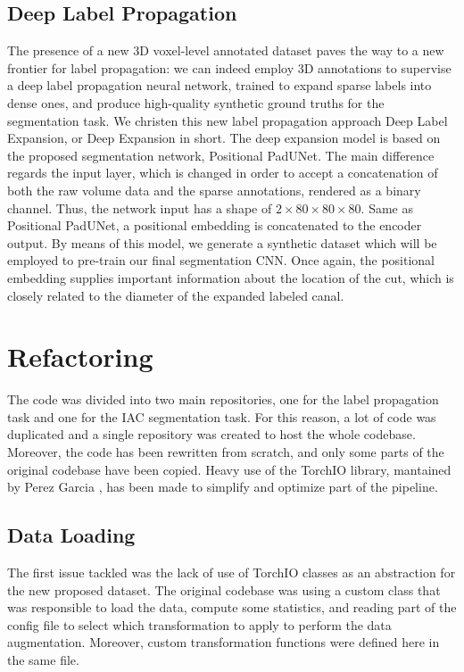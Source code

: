 \subsection{Deep Label Propagation}
The presence of a new 3D voxel-level annotated dataset paves the way to a new
frontier for label propagation: we can indeed employ 3D annotations to supervise
a deep label propagation neural network, trained to expand sparse labels into
dense ones, and produce high-quality synthetic ground truths for the
segmentation task. We christen this new label propagation approach Deep Label
Expansion, or Deep Expansion in short. The deep expansion model is based on the
proposed segmentation network, Positional PadUNet. The main difference regards
the input layer, which is changed in order to accept a concatenation of both the
raw volume data and the sparse annotations, rendered as a binary channel. Thus,
the network input has a shape of $2 \times 80 \times 80 \times 80$. Same as
Positional PadUNet, a positional embedding is concatenated to the encoder
output. By means of this model, we generate a synthetic dataset which will be
employed to pre-train our final segmentation CNN. Once again, the positional
embedding supplies important information about the location of the cut, which is
closely related to the diameter of the expanded labeled canal.

\section{Refactoring}
The code was divided into two main repositories, one for the label propagation
task and one for the IAC segmentation task. For this reason, a lot of code was
duplicated and a single repository was created to host the whole codebase.
Moreover, the code has been rewritten from scratch, and only some parts of the
original codebase have been copied.
Heavy use of the TorchIO library, mantained by Perez Garcia
\cite{PerezGarcia2021torchio}, has been made to simplify and optimize part of
the pipeline.

\subsection{Data Loading}
The first issue tackled was the lack of use of TorchIO classes as an abstraction
for the new proposed dataset. The original codebase was using a custom class that
was responsible to load the data, compute some statistics, and reading part of
the config file to select which transformation to apply to perform the data
augmentation. Moreover, custom transformation functions were defined here in the
same file.

